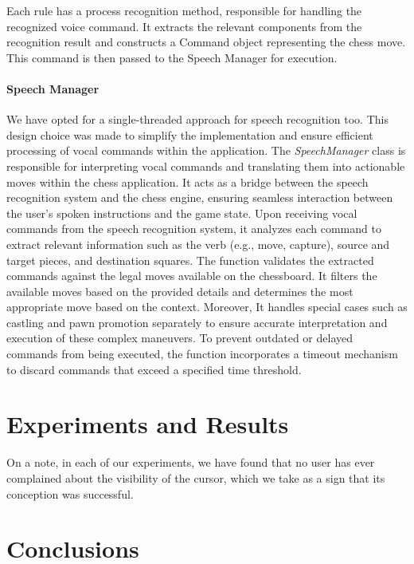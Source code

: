 \documentclass[a4paper, 11pt, twocolumn]{IEEEtran}
\begin{document}
    Each rule has a process recognition method, responsible for handling the recognized voice command. It extracts the relevant components from the recognition result and constructs a Command object representing the chess move. This command is then passed to the Speech Manager for execution.

    \paragraph*{Speech Manager} 
    We have opted for a single-threaded approach for speech recognition too. This design choice was made to simplify the implementation and ensure efficient processing of vocal commands within the application. The \emph{SpeechManager} class is responsible for interpreting vocal commands and translating them into actionable moves within the chess application. It acts as a bridge between the speech recognition system and the chess engine, ensuring seamless interaction between the user's spoken instructions and the game state. Upon receiving vocal commands from the speech recognition system, it analyzes each command to extract relevant information such as the verb (e.g., move, capture), source and target pieces, and destination squares. The function validates the extracted commands against the legal moves available on the chessboard. It filters the available moves based on the provided details and determines the most appropriate move based on the context. Moreover, It handles special cases such as castling and pawn promotion separately to ensure accurate interpretation and execution of these complex maneuvers. To prevent outdated or delayed commands from being executed, the function incorporates a timeout mechanism to discard commands that exceed a specified time threshold.





    
    \section{Experiments and Results}

    On a note, in each of our experiments, we have found that no user has ever complained about the visibility of the cursor, which we take as a sign that its conception was successful.

    \section{Conclusions}
\end{document}
